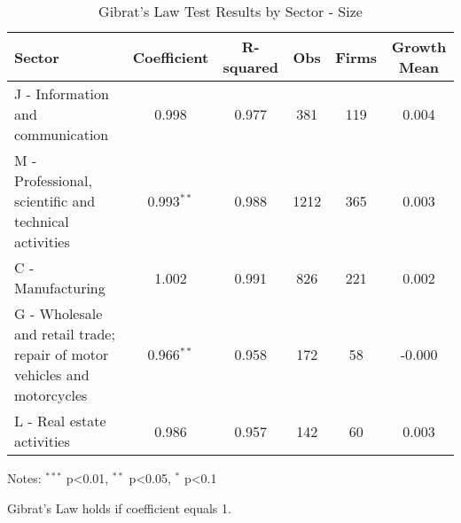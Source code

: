 \begin{table}[htbp]
\centering
\caption{Gibrat's Law Test Results by Sector - Size}
\label{tab:gibrat_sector_size}
\begin{tabular}{lccccc}
\hline\hline
Sector & Coefficient & R-squared & Obs & Firms & Growth Mean \\
\hline
J - Information and communication & 0.998 & 0.977 & 381 & 119 & 0.004 \\
M - Professional, scientific and technical activities & 0.993$^{**}$ & 0.988 & 1212 & 365 & 0.003 \\
C - Manufacturing & 1.002 & 0.991 & 826 & 221 & 0.002 \\
G - Wholesale and retail trade; repair of motor vehicles and motorcycles & 0.966$^{**}$ & 0.958 & 172 & 58 & -0.000 \\
L - Real estate activities & 0.986 & 0.957 & 142 & 60 & 0.003 \\
\hline\hline
\end{tabular}
\begin{tablenotes}
\small
\item Notes: $^{***}$ p<0.01, $^{**}$ p<0.05, $^{*}$ p<0.1
\item Gibrat's Law holds if coefficient equals 1.
\end{tablenotes}
\end{table}